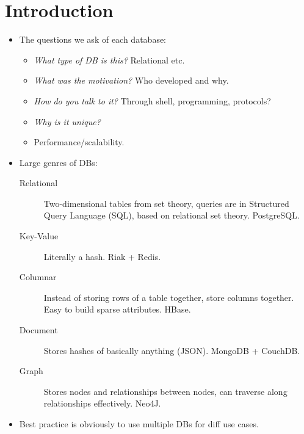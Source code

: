 \documentclass[10pt]{article}
\begin{document}
\onehalfspacing

\pagestyle{fancy}
\cfoot{\thepage/\pageref{LastPage}}

\tableofcontents

\clearpage

\section{Introduction}

\begin{itemize}
    \item The questions we ask of each database:
        \begin{itemize}
            \item \emph{What type of DB is this?} Relational etc.
            \item \emph{What was the motivation?} Who developed and why.
            \item \emph{How do you talk to it?} Through shell, programming,
                protocols?
            \item \emph{Why is it unique?}
            \item Performance/scalability.
        \end{itemize}
    \item Large genres of DBs:
        \begin{description}
            \item[Relational] Two-dimensional tables from set theory, queries
                are in Structured Query Language (SQL), based on relational set
                theory. PostgreSQL.\@
            \item[Key-Value] Literally a hash. Riak + Redis.
            \item[Columnar] Instead of storing rows of a table together, store
                columns together. Easy to build sparse attributes. HBase.
            \item[Document] Stores hashes of basically anything (JSON). MongoDB
                + CouchDB.\@
            \item[Graph] Stores nodes and relationships between nodes, can
                traverse along relationships effectively. Neo4J.
        \end{description}
    \item Best practice is obviously to use multiple DBs for diff use cases.
\end{itemize}
\end{document}
